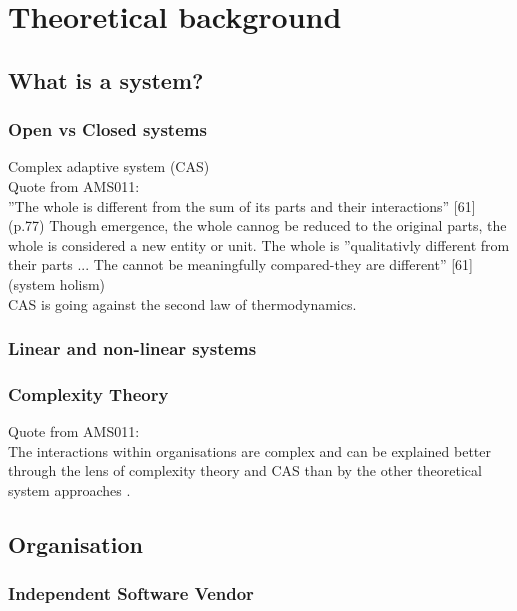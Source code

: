 \chapter{Theoretical background}
\label{ch:theoreticalbackground}

\section{What is a system?}
\label{sec:tbsystem}

\subsection{Open vs Closed systems}

Complex adaptive system (CAS)\\

Quote from AMS011: \parencite{Turner2019}\\
''The whole is different from the sum of its parts and their interactions'' [61] (p.77) Though emergence, the whole cannog be reduced to the original parts, the whole is considered a new entity or unit. The whole is ''qualitativly different from their parts ... The cannot be meaningfully compared-they are different'' [61] (system holism)\\
CAS is going against the second law of thermodynamics.\\

\subsection{Linear and non-linear systems}

\subsection{Complexity Theory}
Quote from AMS011:\\
The interactions within organisations are complex and can be explained better through the lens of complexity theory and CAS than by the other theoretical system approaches \parencite[p. 15]{Turner2019}.

\section{Organisation}
\label{sec:tborganisation}

\subsection{Independent Software Vendor}
\label{sub:tbisv}

